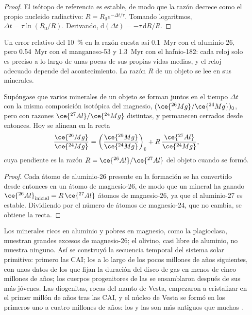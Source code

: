 \begin{proof}
El isótopo de referencia es estable, de modo que la razón decrece como el propio
nucleido radiactivo: $R = R_0 e^{-\Delta t/\tau}$. Tomando logaritmos,
$\Delta t = \tau\ln(R_0/R)$. Derivando, $\mathrm d(\Delta t) =
-\tau\,\mathrm dR/R$.
\end{proof}

Un error relativo del \qty{10}{\percent} en la razón cuesta así
\qty{0.1}{Myr} con el aluminio-26, pero \qty{0.54}{Myr} con el manganeso-53 y
\qty{1.3}{Myr} con el hafnio-182: cada reloj solo es preciso a lo largo de unas pocas de sus
propias vidas medias, y el reloj adecuado depende del acontecimiento. La razón $R$ de un
objeto se lee en sus minerales.

\begin{proposition}
\label{prop:b2:planet-formation-meteorites:al-mg}
Supóngase que varios minerales de un objeto se forman juntos en el tiempo $\Delta t$ con la
misma composición isotópica del magnesio, $(\ce{^{26}Mg}/\ce{^{24}Mg})_0$, pero
con razones $\ce{^{27}Al}/\ce{^{24}Mg}$ distintas, y permanecen cerrados desde entonces. Hoy se
alinean en la recta
\[
  \frac{\ce{^{26}Mg}}{\ce{^{24}Mg}}
  = \left(\frac{\ce{^{26}Mg}}{\ce{^{24}Mg}}\right)_0
  + R\,\frac{\ce{^{27}Al}}{\ce{^{24}Mg}},
\]
cuya pendiente es la razón $R = \ce{^{26}Al}/\ce{^{27}Al}$ del objeto cuando se
formó.
\end{proposition}

\begin{proof}
Cada átomo de aluminio-26 presente en la formación se ha convertido desde entonces en un
átomo de magnesio-26, de modo que un mineral ha ganado
$\ce{^{26}Al}_{\text{inicial}} = R\,\ce{^{27}Al}$ átomos de magnesio-26, ya que el aluminio-27
es estable. Dividiendo por el número de átomos de magnesio-24, que no cambia,
se obtiene la recta.
\end{proof}

Los minerales ricos en aluminio y pobres en magnesio, como la plagioclasa, muestran grandes excesos
de magnesio-26; el olivino, casi libre de aluminio, no muestra ninguno. Así se construyó
la secuencia temporal del sistema solar primitivo: primero las CAI; los  a lo largo de
los pocos millones de años siguientes, con unos datos de los  que fijan la
duración del disco de gas en menos de cinco millones de años; los cuerpos progenitores de
las  se ensamblaron después de sus  más jóvenes. Las diogenitas,
rocas del manto de Vesta, empezaron a cristalizar en el primer millón de años tras
las CAI, y el núcleo de Vesta se formó en los primeros uno a
cuatro millones de años: los  y las  son más antiguos que muchas
.

